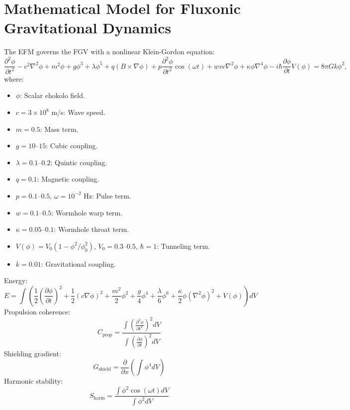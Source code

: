 \documentclass[11pt]{article}
\begin{document}
\section{Mathematical Model for Fluxonic Gravitational Dynamics}
The EFM governs the FGV with a nonlinear Klein-Gordon equation:
\begin{equation}
\frac{\partial^2 \phi}{\partial t^2} - c^2 \nabla^2 \phi + m^2 \phi + g \phi^3 + \lambda \phi^5 + q (B \times \nabla \phi) + p \frac{\partial^2 \phi}{\partial t^2} \cos(\omega t) + w v c \nabla^2 \phi + \kappa \phi \nabla^4 \phi - i \hbar \frac{\partial \phi}{\partial t} V(\phi) = 8\pi G k \phi^2,
\end{equation}
where:
\begin{itemize}
    \item $\phi$: Scalar ehokolo field.
    \item $c = 3 \times 10^8$ m/s: Wave speed.
    \item $m = 0.5$: Mass term.
    \item $g = 10$--$15$: Cubic coupling.
    \item $\lambda = 0.1$--$0.2$: Quintic coupling.
    \item $q = 0.1$: Magnetic coupling.
    \item $p = 0.1$--$0.5$, $\omega = 10^{-2}$ Hz: Pulse term.
    \item $w = 0.1$--$0.5$: Wormhole warp term.
    \item $\kappa = 0.05$--$0.1$: Wormhole throat term.
    \item $V(\phi) = V_0 (1 - \phi^2/\phi_0^2)$, $V_0 = 0.3$--$0.5$, $\hbar = 1$: Tunneling term.
    \item $k = 0.01$: Gravitational coupling.
\end{itemize}
Energy:
\begin{equation}
E = \int \left( \frac{1}{2} \left( \frac{\partial \phi}{\partial t} \right)^2 + \frac{1}{2} (c \nabla \phi)^2 + \frac{m^2}{2} \phi^2 + \frac{g}{4} \phi^4 + \frac{\lambda}{6} \phi^6 + \frac{\kappa}{2} \phi (\nabla^2 \phi)^2 + V(\phi) \right) dV
\end{equation}
Propulsion coherence:
\begin{equation}
C_{\text{prop}} = \frac{\int \left( \frac{\partial^2 \phi}{\partial t^2} \right)^2 dV}{\int \left( \frac{\partial \phi}{\partial t} \right)^2 dV}
\end{equation}
Shielding gradient:
\begin{equation}
G_{\text{shield}} = \frac{\partial}{\partial x} \left( \int \phi^4 dV \right)
\end{equation}
Harmonic stability:
\begin{equation}
S_{\text{harm}} = \frac{\int \phi^2 \cos(\omega t) dV}{\int \phi^2 dV}
\end{equation}
\end{document}
